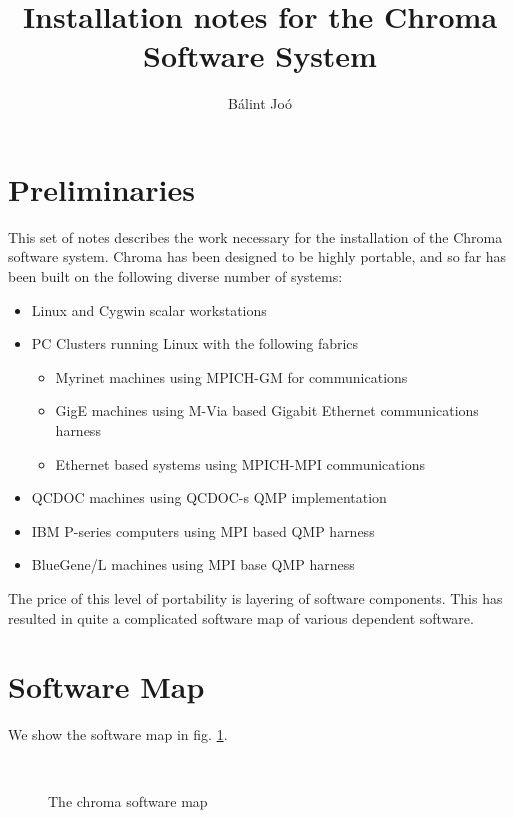 \documentclass{article}
\title{Installation notes for the Chroma Software System}
\author{B\'alint Jo\'o}
\begin{document}
\maketitle
\tableofcontents
\section{Preliminaries}
This set of notes describes the work necessary for the installation
of the Chroma software system. Chroma has been designed to be highly portable,
and so far has been built on the following diverse number of systems:
\begin{itemize}
\item
Linux and Cygwin scalar workstations
\item
PC Clusters running Linux with the following fabrics
\begin{itemize}
\item 
Myrinet machines using MPICH-GM for communications
\item
GigE machines using M-Via based Gigabit Ethernet communications harness
\item
Ethernet based systems using MPICH-MPI communications
\end{itemize}
\item
QCDOC machines using QCDOC-s QMP implementation
\item
IBM P-series computers using MPI based QMP harness
\item
BlueGene/L machines using MPI base QMP harness
\end{itemize}

The price of this level of portability is layering of software components.
This has resulted in quite a complicated software map of various dependent software. 

\section{Software Map}
We show the software map in fig. \ref{f:SoftwareMap}.
\begin{figure}[ht]
\begin{center}
\leavevmode
\hbox{%
\epsfxsize=5in
}
\caption{The chroma software map}
\end{center}
\label{f:SoftwareMap}
\end{figure}
\end{document}

